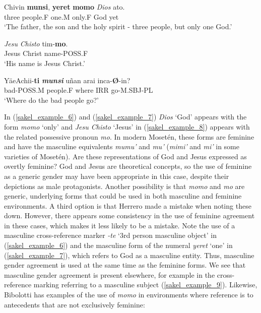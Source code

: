 \documentclass[output=paper,colorlinks,citecolor=brown
]{langscibook}
\begin{document}
     Chivin \textbf{munsi}, 		\textbf{yeret} 	\textbf{momo} 	\emph{Dios} 	ato.\\
    three	people.F	one.M	only.F	God	yet\\
\glt ‘The father, the son and the holy spirit - three people, but only one God.’
\z	

\ea \label{sakel_example_8}
\gll \emph{Jesu} \emph{Chisto} 	tim-\textbf{mo}.\\
     Jesus Christ	name-POSS.F\\
\glt ‘His name is Jesus Christ.’
\z

 \ea \label{sakel_example_9}
\gll YäeAchii-\textbf{ti} 	\textbf{\emph{munsi}} 		uñan 	arai 	inca-\textbf{Ø}-in?\\
     bad-POSS.M	people.F	where	IRR	go-M.SBJ-PL\\
\glt ‘Where do the bad people go?’
\z

In (\ref{sakel_example_6}) and (\ref{sakel_example_7}) \textit{Dios} ‘God’ appears with the form \textit{momo} ‘only’ and \textit{Jesu Chisto} ‘Jesus’ in (\ref{sakel_example_8}) appears with the related possessive pronoun \textit{mo}. In modern Mosetén, these forms are feminine and have the masculine equivalents \textit{mumu’} and \textit{mu’} (\textit{mimi’} and \textit{mi’} in some varieties of Mosetén). Are these representations of God and Jesus expressed as overtly feminine? God and Jesus are theoretical concepts, so the use of feminine as a generic gender may have been appropriate in this case, despite their depictions as male protagonists. Another possibility is that \textit{momo} and \textit{mo} are generic, underlying forms that could be used in both masculine and feminine environments. A third option is that Herrero made a mistake when noting these down. However, there appears some consistency in the use of feminine agreement in these cases, which makes it less likely to be a mistake. 
Note the use of a masculine cross-reference marker \textit{-te} ‘3rd person masculine object’ in (\ref{sakel_example_6}) and the masculine form of the numeral \textit{yeret} ‘one’ in (\ref{sakel_example_7}), which refers to God as a masculine entity. Thus, masculine gender agreement is used at the same time as the feminine forms. We see that masculine gender agreement is present elsewhere, for example in the cross-reference marking referring to a masculine subject (\ref{sakel_example_9}). 
Likewise, Bibolotti has examples of the use of \textit{momo} in environments where reference is to antecedents that are not exclusively feminine: 
\end{document}
